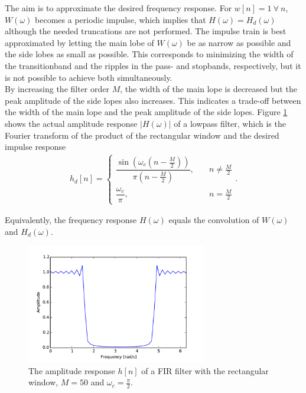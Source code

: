 %
The aim is to approximate the desired frequency response. For $w[n]=1 \ \forall \ n$, $W(\omega)$ becomes a periodic impulse, which implies that $H(\omega) = H_d(\omega)$ although the needed truncations are not performed. The impulse train is best approximated by letting the main lobe of $W(\omega)$ be as narrow as possible and the side lobes as small as possible. This corresponds to minimizing the width of the transitionband and the ripples in the pass- and stopbands, respectively, but it is not possible to achieve both simultaneously. \\
By increasing the filter order $M$, the width of the main lope is decreased but the peak amplitude of the side lopes also increases. This indicates a trade-off between the width of the main lope and the peak amplitude of the side lopes. Figure \ref{fig:lowpass_real} shows the actual amplitude response $|H(\omega)|$ of a lowpass filter, which is the Fourier transform of the product of the rectangular window and the desired impulse response 
\begin{align*}
h_d[n] =
\begin{cases}
\dfrac{\sin\left(\omega_c\left(n - \frac{M}{2}\right)\right)}{\pi\left(n-\frac{M}{2}\right)}, \quad &n \neq \frac{M}{2} \\
\dfrac{\omega_c}{\pi}, \quad &n = \frac{M}{2}
\end{cases}.
\end{align*}

Equivalently, the frequency response $H(\omega)$ equals the convolution of $W(\omega)$ and $H_d(\omega)$. 

\begin{figure}[H]
\centering
\includegraphics[width=0.7\textwidth]{figures/filter_teori/lowpass_real.pdf}
\caption{The amplitude response $h[n]$ of a FIR filter with the rectangular window, $M = 50$ and $\omega_c = \frac{\pi}{2}$.}
\label{fig:lowpass_real}
\end{figure}

